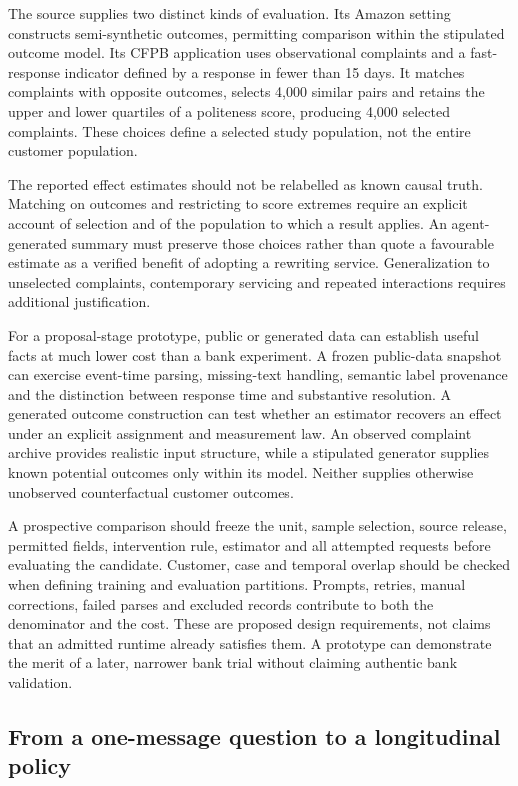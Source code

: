 The source supplies two distinct kinds of evaluation. Its Amazon setting constructs semi-synthetic outcomes, permitting comparison within the stipulated outcome model. Its CFPB application uses observational complaints and a fast-response indicator defined by a response in fewer than 15 days. It matches complaints with opposite outcomes, selects 4,000 similar pairs and retains the upper and lower quartiles of a politeness score, producing 4,000 selected complaints. These choices define a selected study population, not the entire customer population.\citep{exec28_lm_pryzant}

The reported effect estimates should not be relabelled as known causal truth. Matching on outcomes and restricting to score extremes require an explicit account of selection and of the population to which a result applies. An agent-generated summary must preserve those choices rather than quote a favourable estimate as a verified benefit of adopting a rewriting service. Generalization to unselected complaints, contemporary servicing and repeated interactions requires additional justification.

For a proposal-stage prototype, public or generated data can establish useful facts at much lower cost than a bank experiment. A frozen public-data snapshot can exercise event-time parsing, missing-text handling, semantic label provenance and the distinction between response time and substantive resolution. A generated outcome construction can test whether an estimator recovers an effect under an explicit assignment and measurement law. An observed complaint archive provides realistic input structure, while a stipulated generator supplies known potential outcomes only within its model. Neither supplies otherwise unobserved counterfactual customer outcomes.

A prospective comparison should freeze the unit, sample selection, source release, permitted fields, intervention rule, estimator and all attempted requests before evaluating the candidate. Customer, case and temporal overlap should be checked when defining training and evaluation partitions. Prompts, retries, manual corrections, failed parses and excluded records contribute to both the denominator and the cost. These are proposed design requirements, not claims that an admitted runtime already satisfies them. A prototype can demonstrate the merit of a later, narrower bank trial without claiming authentic bank validation.

\subsection{From a one-message question to a longitudinal policy}

